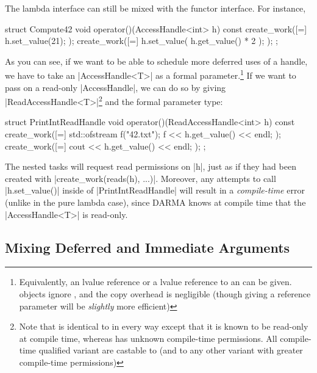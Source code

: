 The lambda interface can still be mixed with the functor interface.  For
instance,
\begin{CppCodeNumb}
struct Compute42 {
  void operator()(AccessHandle<int> h) const {
    create_work([=]{
      h.set_value(21);
    });
    create_work([=]{
      h.set_value( h.get_value() * 2 );
    });
  }
};
\end{CppCodeNumb}
As you can see, if we want to be able to schedule more deferred uses of a
handle, we have to take an |AccessHandle<T>| as a formal
parameter.\footnote{Equivalently, an lvalue reference or a 
lvalue reference to an  can be given. 
 objects ignore , and the copy
overhead is negligible (though giving a reference parameter will be {\it
slightly} more efficient)}  If we want to pass on a read-only |AccessHandle|, we
can do so by giving |ReadAccessHandle<T>|\footnote{Note that
 is identical to 
in every way except that it is known to be read-only at compile time, whereas
 has unknown compile-time permissions.  All
compile-time qualified  variant are castable to
 (and to any other 
variant with greater compile-time permissions)} and the formal parameter type:
\begin{CppCodeNumb}
struct PrintIntReadHandle {
  void operator()(ReadAccessHandle<int> h) const {
    create_work([=]{
      std::ofstream f("42.txt");
      f << h.get_value() << endl;
    });
    create_work([=]{
      cout << h.get_value() << endl;
    });
  }
};
\end{CppCodeNumb}
The nested tasks will request read permissions on |h|, just as if they had been
created with |create_work(reads(h), ...)|.  Moreover, any attempts to call
|h.set_value()| inside of |PrintIntReadHandle| will result in a {\it
compile-time} error (unlike in the pure lambda case), since DARMA knows at
compile time that the |AccessHandle<T>| is read-only.  

\subsection{Mixing Deferred and Immediate Arguments}

